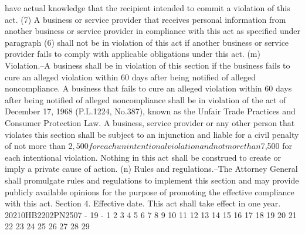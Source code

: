 have actual knowledge that the recipient intended to
commit a violation of this act.
(7) A business or service provider that receives
personal information from another business or service
provider in compliance with this act as specified under
paragraph (6) shall not be in violation of this act if
another business or service provider fails to comply with
applicable obligations under this act.
(m) Violation.--A business shall be in violation of this
section if the business fails to cure an alleged violation
within 60 days after being notified of alleged noncompliance. A
business that fails to cure an alleged violation within 60 days
after being notified of alleged noncompliance shall be in
violation of the act of December 17, 1968 (P.L.1224, No.387),
known as the Unfair Trade Practices and Consumer Protection Law.
A business, service provider or any other person that violates
this section shall be subject to an injunction and liable for a
civil penalty of not more than $2,500 for each unintentional
violation and not more than $7,500 for each intentional
violation. Nothing in this act shall be construed to create or
imply a private cause of action.
(n) Rules and regulations.--The Attorney General shall
promulgate rules and regulations to implement this section and
may provide publicly available opinions for the purpose of
promoting the effective compliance with this act.
Section 4. Effective date.
This act shall take effect in one year.
20210HB2202PN2507 - 19 -
1
2
3
4
5
6
7
8
9
10
11
12
13
14
15
16
17
18
19
20
21
22
23
24
25
26
27
28
29
